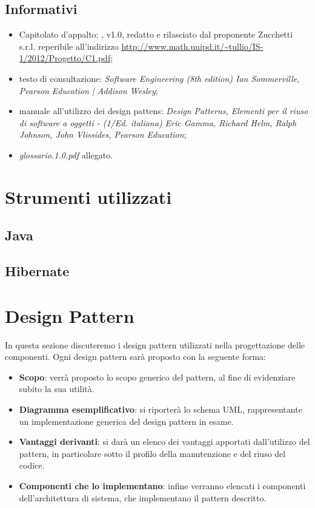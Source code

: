 \subsection{Informativi}
\begin{itemize}
\item[] Capitolato d'appalto: \caName{}, v1.0, redatto e rilasciato dal proponente Zucchetti s.r.l. reperibile all'indirizzo \url{http://www.math.unipd.it/~tullio/IS-1/2012/Progetto/C1.pdf};
\item[] testo di consultazione: \textit{Software Engineering (8th edition) Ian Sommerville, Pearson Education | Addison Wesley};
\item[] manuale all'utilizzo dei design pattens: \textit{Design Patterns, Elementi per il riuso di software a oggetti - (1/Ed. italiana) Eric Gamma, Richard Helm, Ralph Johnson, John Vlissides, Pearson Education};
\item[] \textit{glossario.1.0.pdf} allegato.
\end{itemize}

\section{Strumenti utilizzati}
\subsection{Java}

\subsection{Hibernate}


\clearpage
\section{Design Pattern}
In questa sezione discuteremo i design pattern utilizzati nella progettazione delle componenti. Ogni design pattern sarà proposto con la seguente forma:

\begin{itemize}
	\item \textbf{Scopo}: verrà proposto lo scopo generico del pattern, al fine di evidenziare subito la sua utilità.
	\item \textbf{Diagramma esemplificativo}: si riporterà lo schema UML, rappresentante un implementazione generica del design pattern in esame.
	\item \textbf{Vantaggi derivanti}: si darà un elenco dei vantaggi apportati dall'utilizzo del pattern, in particolare sotto il profilo della manutenzione e del riuso del codice.
	\item \textbf{Componenti che lo implementano}: infine verranno elencati i componenti dell'architettura di sistema, che implementano il pattern descritto.
\end{itemize}

